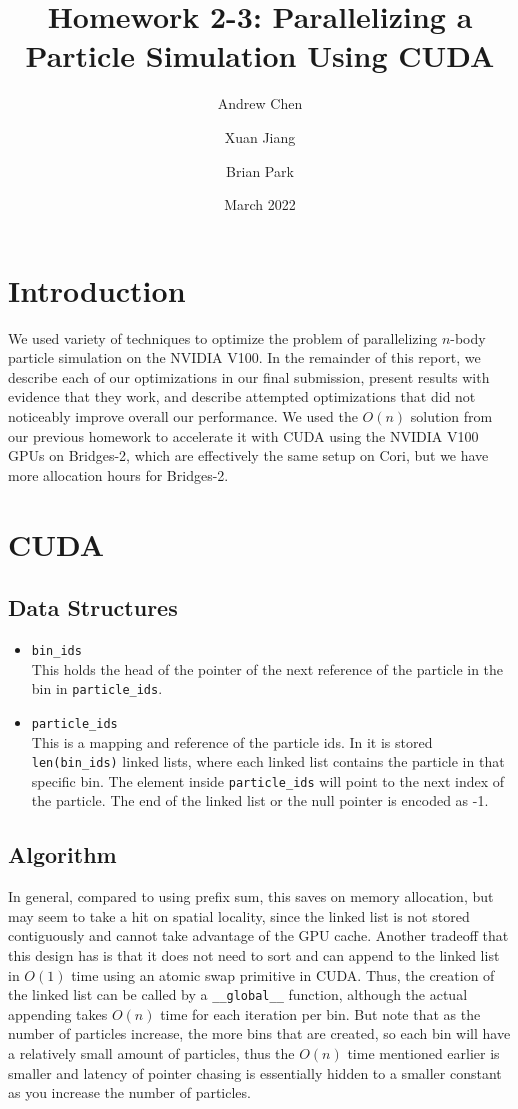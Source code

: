\documentclass{article}
\title{Homework 2-3: Parallelizing a Particle Simulation Using CUDA}
\author{Andrew Chen}
\author{Xuan Jiang}
\author{Brian Park}
\affil{UC Berkeley, Computer Science 267}
\date{March 2022}
\begin{document}
\maketitle

\section{Introduction}
We used variety of techniques to optimize the problem of parallelizing $n$-body particle simulation on the NVIDIA V100. In the remainder of this report, we describe each of our optimizations in our final submission, present results with evidence that they work, and describe attempted optimizations that did not noticeably improve overall our performance. We used the $O(n)$ solution from our previous homework to accelerate it with CUDA using the NVIDIA V100 GPUs on Bridges-2, which are effectively the same setup on Cori, but we have more allocation hours for Bridges-2.


\section{CUDA}
\subsection{Data Structures}
\begin{itemize}
	\item \verb|bin_ids| \\
	      This holds the head of the pointer of the next reference of the particle in the bin in \verb|particle_ids|.
	\item \verb|particle_ids| \\
	      This is a mapping and reference of the particle ids. In it is stored \verb|len(bin_ids)| linked lists, where each linked list contains the particle in that specific bin. The element inside \verb|particle_ids| will point to the next index of the particle. The end of the linked list or the null pointer is encoded as -1.
\end{itemize}

\subsection{Algorithm}
In general, compared to using prefix sum, this saves on memory allocation, but may seem to take a hit on spatial locality, since the linked list is not stored contiguously and cannot take advantage of the GPU cache. Another tradeoff that this design has is that it does not need to sort and can append to the linked list in $O(1)$ time using an atomic swap primitive in CUDA. Thus, the creation of the linked list can be called by a \verb|__global__| function, although the actual appending takes $O(n)$ time for each iteration per bin. But note that as the number of particles increase, the more bins that are created, so each bin will have a relatively small amount of particles, thus the $O(n)$ time mentioned earlier is smaller and latency of pointer chasing is essentially hidden to a smaller constant as you increase the number of particles.
\end{document}

